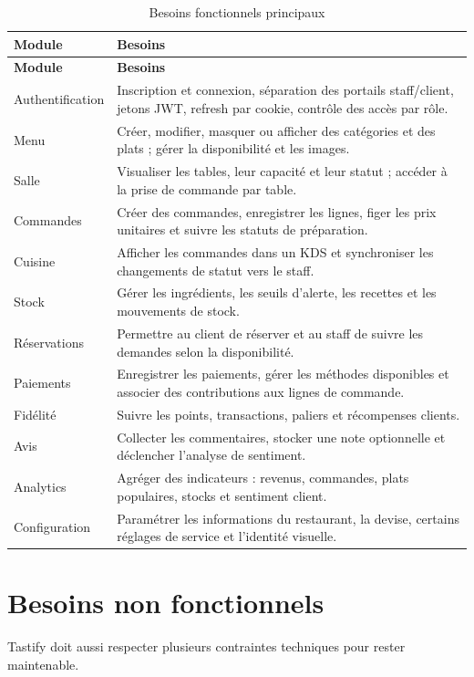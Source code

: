 \begin{longtable}{p{3.2cm}p{10.5cm}}
\caption{Besoins fonctionnels principaux}
\label{tab:besoins-fonctionnels}\\
\toprule
\textbf{Module} & \textbf{Besoins} \\
\midrule
\endfirsthead
\toprule
\textbf{Module} & \textbf{Besoins} \\
\midrule
\endhead
Authentification & Inscription et connexion, séparation des portails staff/client, jetons JWT, refresh par cookie, contrôle des accès par rôle. \\
Menu & Créer, modifier, masquer ou afficher des catégories et des plats ; gérer la disponibilité et les images. \\
Salle & Visualiser les tables, leur capacité et leur statut ; accéder à la prise de commande par table. \\
Commandes & Créer des commandes, enregistrer les lignes, figer les prix unitaires et suivre les statuts de préparation. \\
Cuisine & Afficher les commandes dans un KDS et synchroniser les changements de statut vers le staff. \\
Stock & Gérer les ingrédients, les seuils d'alerte, les recettes et les mouvements de stock. \\
Réservations & Permettre au client de réserver et au staff de suivre les demandes selon la disponibilité. \\
Paiements & Enregistrer les paiements, gérer les méthodes disponibles et associer des contributions aux lignes de commande. \\
Fidélité & Suivre les points, transactions, paliers et récompenses clients. \\
Avis & Collecter les commentaires, stocker une note optionnelle et déclencher l'analyse de sentiment. \\
Analytics & Agréger des indicateurs : revenus, commandes, plats populaires, stocks et sentiment client. \\
Configuration & Paramétrer les informations du restaurant, la devise, certains réglages de service et l'identité visuelle. \\
\bottomrule
\end{longtable}

\section{Besoins non fonctionnels}
Tastify doit aussi respecter plusieurs contraintes techniques pour rester maintenable.

